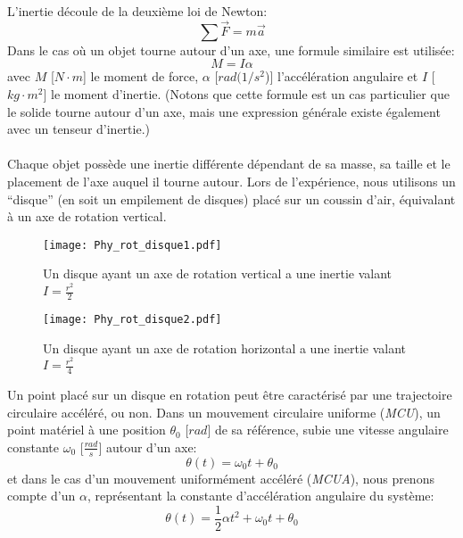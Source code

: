 L'inertie découle de la deuxième loi de Newton:
$$
    \sum{\vec{F}} = m \vec{a}
$$
Dans le cas où un objet tourne autour d'un axe, une formule similaire est utilisée:
$$
    M = I \alpha 
$$
avec $M$ [$N \cdot m$] le moment de force, $\alpha$ [$rad(1/s^2$)] l'accélération angulaire et $I$ [$kg \cdot m^2$] le moment d'inertie. (Notons que cette formule est un cas particulier que le solide tourne autour d'un axe, mais une expression générale existe également avec un tenseur d'inertie.)\\ \\
Chaque objet possède une inertie différente dépendant de sa masse, sa taille et le placement de l'axe auquel il tourne autour. Lors de l'expérience, nous utilisons un ``disque'' (en soit un empilement de disques) placé sur un coussin d'air, équivalant à un axe de rotation vertical.

\begin{figure}[H]
  \centering
  \begin{minipage}[b]{0.4\textwidth}
    \texttt{[image: Phy\_rot\_disque1.pdf]}
    \caption{Un disque ayant un axe de rotation vertical a une inertie valant $I = \frac{r^2}{2}$}
  \end{minipage}
  \hfill
  \begin{minipage}[b]{0.4\textwidth}
    \texttt{[image: Phy\_rot\_disque2.pdf]}
    \caption{Un disque ayant un axe de rotation horizontal a une inertie valant $I = \frac{r^2}{4}$}
  \end{minipage}
\end{figure}

Un point placé sur un disque en rotation peut être caractérisé par une trajectoire circulaire accéléré, ou non. Dans un mouvement circulaire uniforme (\textit{MCU}), un point matériel à une position $\theta_0$ [$rad$] de sa référence, subie une vitesse angulaire constante $\omega_0$ [$\frac{rad}{s}]$ autour d'un axe:
$$
    \theta(t) = \omega_0 t + \theta_0
$$
et dans le cas d'un mouvement uniformément accéléré (\textit{MCUA}), nous prenons compte d'un $\alpha$, représentant la constante d'accélération angulaire du système:
$$
    \theta(t) = \frac{1}{2} \alpha t^2 + \omega_0 t + \theta_0
$$
